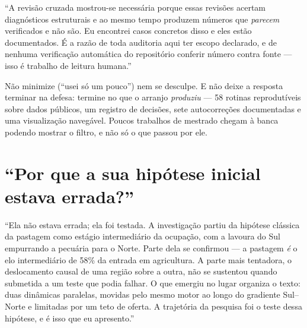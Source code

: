 \begin{nabanca}
``A revisão cruzada mostrou-se necessária porque essas revisões acertam
diagnósticos estruturais e ao mesmo tempo produzem números que \emph{parecem}
verificados e não são. Eu encontrei casos concretos disso e eles estão
documentados. É a razão de toda auditoria aqui ter escopo declarado, e de
nenhuma verificação automática do repositório conferir número contra fonte ---
isso é trabalho de leitura humana.''
\end{nabanca}

\begin{armadilha}
Não minimize (``usei só um pouco'') nem se desculpe. E não deixe a resposta
terminar na defesa: termine no que o arranjo \emph{produziu} --- 58 rotinas
reprodutíveis sobre dados públicos, um registro de decisões, sete autocorreções
documentadas e uma visualização navegável. Poucos trabalhos de mestrado chegam à
banca podendo mostrar o filtro, e não só o que passou por ele.
\end{armadilha}

\section{``Por que a sua hipótese inicial estava errada?''}

\begin{nabanca}
``Ela não estava errada; ela foi testada. A investigação partiu da hipótese
clássica da pastagem como estágio intermediário da ocupação, com a lavoura do
Sul empurrando a pecuária para o Norte. Parte dela se confirmou --- a pastagem
\emph{é} o elo intermediário de 58\% da entrada em agricultura. A parte mais
tentadora, o deslocamento causal de uma região sobre a outra, não se sustentou
quando submetida a um teste que podia falhar. O que emergiu no lugar organiza o
texto: duas dinâmicas paralelas, movidas pelo mesmo motor ao longo do gradiente
Sul--Norte e limitadas por um teto de oferta. A trajetória da pesquisa foi o
teste dessa hipótese, e é isso que eu apresento.''
\end{nabanca}
